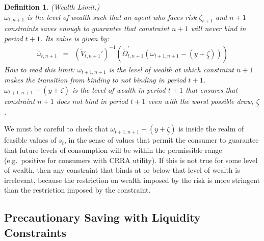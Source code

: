 \documentclass[titlepage]{\econtex}
\providecommand{\wAlt}{\omega}
\newtheorem{defn}{Definition}
\begin{document}
  \begin{defn}(Wealth Limit.)\\
    ${\bar{\wAlt}}_{t,n+1}$ is the level of wealth such that an agent who faces risk $\zeta_{t+1}$ and $n+1$ constraints saves enough to guarantee that constraint $n+1$ will never bind in period $t+1$.  Its value is given by:
    \begin{eqnarray}
      {\bar{\wAlt}}_{t,n+1} & = & \left(\tilde{V}_{t,n+1}'\right)^{-1}(\tilde{\Omega}_{t,n+1}^{\prime}(\wAlt_{t+1,n+1}-({y}+\underline{\zeta}))) \label{eq:tildeomegabar}
    \end{eqnarray}
    How to read this limit: $\wAlt_{t+1,n+1}$ is the level of wealth at which constraint $n+1$ makes the transition from binding to not binding in period $t+1$. $\wAlt_{t+1,n+1} - ({y} + \underline{\zeta})$ is the level of wealth in period $t+1$ that ensures that constraint $n+1$ does not bind in period $t+1$ even with the worst possible draw, $\underline{\zeta}$.
  \end{defn}

  \noindent We must be careful to check that $\wAlt_{t+1,n+1}-({y}+\underline{\zeta})$ is inside the realm of feasible values of $s_{t}$, in the sense of values that permit the consumer to guarantee that future levels of consumption will be within the permissible range (e.g.\ positive for consumers with CRRA utility). If this is not true for some level of wealth, then any constraint that binds at or below that level of wealth is irrelevant, because the restriction on wealth imposed by the risk is more stringent than the restriction imposed by the constraint.


  \subsection{Precautionary Saving with Liquidity Constraints}
\end{document}
